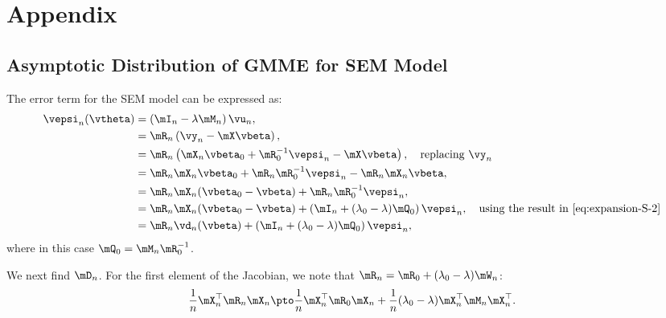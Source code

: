 \section*{Appendix}


\begin{subappendices}

\section{Asymptotic Distribution of GMME for SEM Model}

The error term for the SEM model can be expressed as:
\begin{equation*}
\begin{aligned}
\vepsi_n(\vtheta) & = \left(\mI_n - \lambda\mM_n\right)\vu_n, \\
& = \mR_n\left(\vy_n - \mX\vbeta\right), \\
& = \mR_n\left(\mX_n\vbeta_0 + \mR_0^{-1}\vepsi_n - \mX\vbeta\right),\quad \mbox{replacing $\vy_n$} \\
& = \mR_n\mX_n\vbeta_0 + \mR_n\mR_0^{-1}\vepsi_n - \mR_n\mX_n\vbeta, \\
& = \mR_n\mX_n(\vbeta_0 - \vbeta) + \mR_n\mR_0^{-1}\vepsi_n, \\
& = \mR_n\mX_n(\vbeta_0 - \vbeta) + \left(\mI_n + (\lambda_0 - \lambda)\mQ_0\right)\vepsi_n, \quad \mbox{using the result in \eqref{eq:expansion-S-2}} \\
& = \mR_n\vd_n(\vbeta) + \left(\mI_n + (\lambda_0 - \lambda)\mQ_0\right)\vepsi_n,
\end{aligned}
\end{equation*}
%
where in this case $\mQ_0 = \mM_n\mR_0^{-1}$. 

We next find $\mD_n$. For the first element of the Jacobian, we note that $\mR_n = \mR_0 + (\lambda_0 - \lambda)\mW_n$:
\begin{equation*}
\frac{1}{n}\mX_n^\top\mR_n\mX_n \pto \frac{1}{n}\mX_n^\top\mR_0\mX_n +\frac{1}{n}(\lambda_0 - \lambda)\mX^\top_n\mM_n\mX_n^\top.
\end{equation*}


\end{subappendices}
